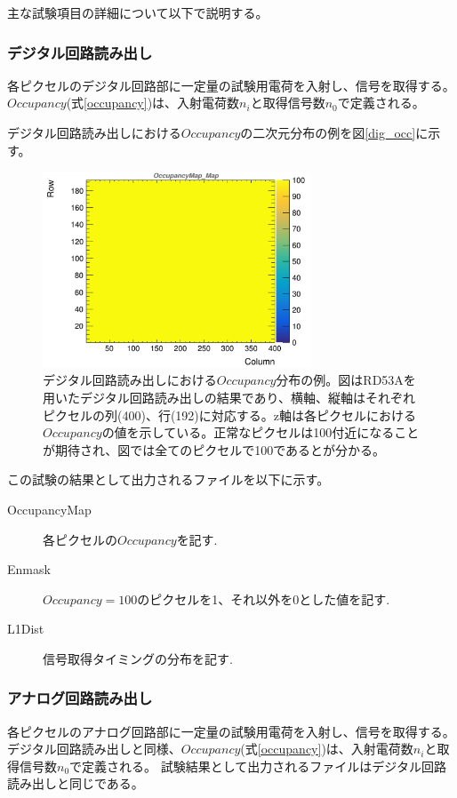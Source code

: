 主な試験項目の詳細について以下で説明する。

\subsubsection{デジタル回路読み出し}
各ピクセルのデジタル回路部に一定量の試験用電荷を入射し、信号を取得する。
$Occupancy$(式\ref{occupancy})は、入射電荷数$n_i$と取得信号数$n_0$で定義される。

デジタル回路読み出しにおける$Occupancy$の二次元分布の例を図\ref{dig_occ}に示す。
\begin{figure}[bpt]\centering
\includegraphics[width=8cm]{dig_occ}
\caption[デジタル回路読み出しにおける$Occupancy$分布の例。]{デジタル回路読み出しにおける$Occupancy$分布の例。図はRD53Aを用いたデジタル回路読み出しの結果であり、横軸、縦軸はそれぞれピクセルの列(400)、行(192)に対応する。z軸は各ピクセルにおける$Occupancy$の値を示している。正常なピクセルは100付近になることが期待され、図では全てのピクセルで100であるとが分かる。}
\label{threshold_scurve}
\end{figure}

この試験の結果として出力されるファイルを以下に示す。
\begin{description}
  \item [OccupancyMap] 各ピクセルの$Occupancy$を記す.
  \item [Enmask] $Occupancy=100$のピクセルを1、それ以外を0とした値を記す.
  \item [L1Dist] 信号取得タイミングの分布を記す.
\end{description}

\subsubsection{アナログ回路読み出し}
各ピクセルのアナログ回路部に一定量の試験用電荷を入射し、信号を取得する。
デジタル回路読み出しと同様、$Occupancy$(式\ref{occupancy})は、入射電荷数$n_i$と取得信号数$n_0$で定義される。
試験結果として出力されるファイルはデジタル回路読み出しと同じである。

